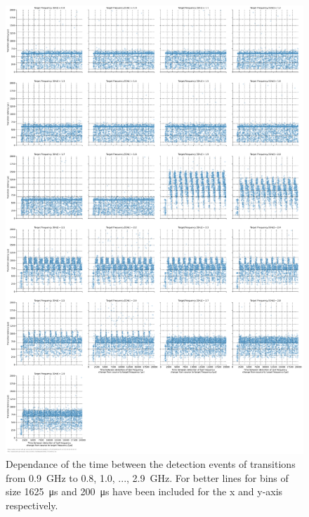 \begin{figure}[]
    \centering
    \includegraphics[width=\columnwidth]{fig/ftalat/ftalat_scatter_wait_transition_latency_hati_source_0.9.pdf}
    \caption{Dependance of the time between the detection events of transitions from \SI{0.9}{\GHz} to \SI{0.8}{}, \SI{1.0}{}, ..., \SI{2.9}{\GHz}. For better lines for bins of size \SI{1625}{\us} and \SI{200}{\us} have been included for the x and y-axis respectively.}
\end{figure}
